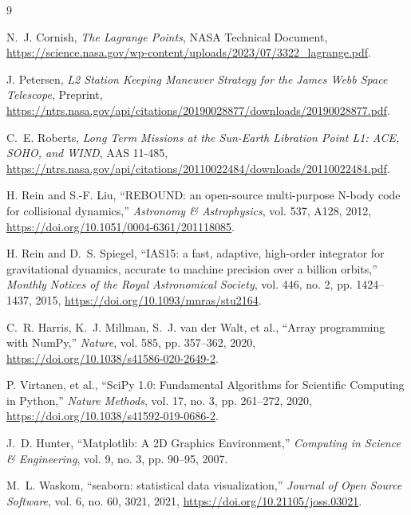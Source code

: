 \documentclass[12pt, letterpaper]{article}
\begin{document}
\begin{thebibliography}{9}
\singlespacing

N.~J. Cornish, \textit{The Lagrange Points}, NASA Technical Document, \url{https://science.nasa.gov/wp-content/uploads/2023/07/3322_lagrange.pdf}.

J. Petersen, \textit{L2 Station Keeping Maneuver Strategy for the James Webb Space Telescope}, Preprint, \url{https://ntrs.nasa.gov/api/citations/20190028877/downloads/20190028877.pdf}.

C.~E. Roberts, \textit{Long Term Missions at the Sun-Earth Libration Point L1: ACE, SOHO, and WIND}, AAS 11-485, \url{https://ntrs.nasa.gov/api/citations/20110022484/downloads/20110022484.pdf}.

H. Rein and S.-F. Liu, ``REBOUND: an open-source multi-purpose N-body code for collisional dynamics,'' \textit{Astronomy \& Astrophysics}, vol. 537, A128, 2012, \url{https://doi.org/10.1051/0004-6361/201118085}.

H. Rein and D.~S. Spiegel, ``IAS15: a fast, adaptive, high-order integrator for gravitational dynamics, accurate to machine precision over a billion orbits,'' \textit{Monthly Notices of the Royal Astronomical Society}, vol. 446, no. 2, pp. 1424--1437, 2015, \url{https://doi.org/10.1093/mnras/stu2164}.

C.~R. Harris, K.~J. Millman, S.~J. van der Walt, et al., ``Array programming with NumPy,'' \textit{Nature}, vol. 585, pp. 357--362, 2020, \url{https://doi.org/10.1038/s41586-020-2649-2}.

P. Virtanen, et al., ``SciPy 1.0: Fundamental Algorithms for Scientific Computing in Python,'' \textit{Nature Methods}, vol. 17, no. 3, pp. 261--272, 2020, \url{https://doi.org/10.1038/s41592-019-0686-2}.

J.~D. Hunter, ``Matplotlib: A 2D Graphics Environment,'' \textit{Computing in Science \& Engineering}, vol. 9, no. 3, pp. 90--95, 2007.

M.~L. Waskom, ``seaborn: statistical data visualization,'' \textit{Journal of Open Source Software}, vol. 6, no. 60, 3021, 2021, \url{https://doi.org/10.21105/joss.03021}.

\end{thebibliography}
\end{document}
